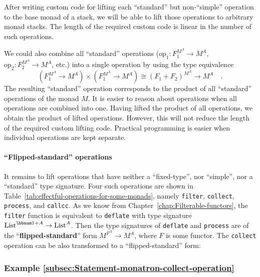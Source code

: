 After writing custom code for lifting each \textsf{``}standard\textsf{''} but non-\textsf{``}simple\textsf{''}
operation to the base monad of a stack, we will be able to lift those
operations to arbitrary monad stacks. The length of the required custom
code is linear in the number of such operations.

We could also combine all \textsf{``}standard\textsf{''} operations ($\text{op}_{1}:F_{1}^{M^{A}}\rightarrow M^{A}$,
$\text{op}_{2}:F_{2}^{M^{A}}\rightarrow M^{A}$, etc.) into a single
operation by using the type equivalence
\[
(F_{1}^{M^{A}}\rightarrow M^{A})\times(F_{1}^{M^{A}}\rightarrow M^{A})\cong(F_{1}+F_{2})^{M^{A}}\rightarrow M^{A}\quad.
\]
The resulting \textsf{``}standard\textsf{''} operation corresponds to the product
of all \textsf{``}standard\textsf{''} operations of the monad $M$. It is easier to
reason about operations when all operations are combined into one.
Having lifted the product of all operations, we obtain the product
of lifted operations. However, this will not reduce the length of
the required custom lifting code. Practical programming is easier
when individual operations are kept separate.

\paragraph{\textsf{``}Flipped-standard\textsf{''} operations}

It remains to lift operations that have neither a \textsf{``}fixed-type\textsf{''},
nor \textsf{``}simple\textsf{''}, nor a \textsf{``}standard\textsf{''} type signature. Four such operations
are shown in Table~\ref{tab:effectful-operations-for-some-monads},
namely \lstinline!filter!, \lstinline!collect!, \lstinline!process!,
and \lstinline!callcc!. As we know from Chapter~\ref{chap:Filterable-functors},
the \lstinline!filter! function is equivalent to \lstinline!deflate!
with type signature $\text{List}^{\bbnum 1+A}\rightarrow\text{List}^{A}$.
Then the type signatures of \lstinline!deflate! and \lstinline!process!
are of the \textsf{``}\textbf{flipped-standard}\textsf{''} form $M^{F^{A}}\rightarrow M^{A}$,
where $F$ is some functor. The \lstinline!collect! operation can
be also transformed to a \textsf{``}flipped-standard\textsf{''} form:

\subsubsection{Example \label{subsec:Statement-monatron-collect-operation}\ref{subsec:Statement-monatron-collect-operation}}

